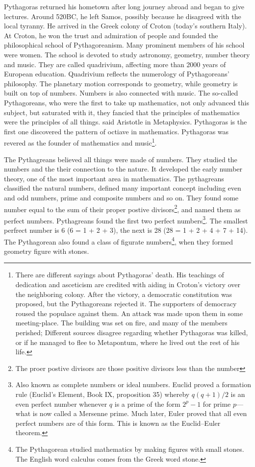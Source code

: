 \documentclass{article}
\begin{document}
Pythagoras returned his hometown after long journey abroad and began to give lectures. Around 520BC, he left Samos, possibly because he disagreed with the local tyranny. He arrived in the Greek colony of Croton (today's southern Italy). At Croton, he won the trust and admiration of people and founded the philosophical school of Pythagoreanism. Many prominent members of his school were women. The school is devoted to study astronomy, geometry, number theory and music. They are called quadrivium, affecting more than 2000 years of European education\cite{StepanovRose15}. Quadrivium reflects the numerology of Pythagoreans' philosophy. The planetary motion corresponds to geometry, while geometry is built on top of numbers. Numbers is also connected with music. The so-called Pythagoreans, who were the first to take up mathematics, not only advanced this subject, but saturated with it, they fancied that the principles of mathematics were the principles of all things. said Aristotle in Metaphysics. Pythagoras is the first one discovered the pattern of octiave in mathematics. Pythagoras was revered as the founder of mathematics and music\footnote{There are different sayings about Pythagoras' death. His teachings of dedication and asceticism are credited with aiding in Croton's victory over the neighboring colony. After the victory, a democratic constitution was proposed, but the Pythagoreans rejected it. The supporters of democracy roused the populace against them. An attack was made upon them in some meeting-place. The building was set on fire, and many of the members perished; Different sources disagree regarding whether Pythagoras was killed, or if he managed to flee to Metapontum, where he lived out the rest of his life.}.

The Pythagreans believed all things were made of numbers. They studied the numbers and the their connection to the nature. It developed the early number theory, one of the most important area in mathematics. The pythagreans classified the natural numbers, defined many important concept including even and odd numbers, prime and composite numbers and so on. They found some number equal to the sum of their proper postive divisors\footnote{The proer postive divisors are those positive divisors less than the number}, and named them as perfect numbers. Pythagreans found the first two perfect numbers\footnote{Also known as complete numbers or ideal numbers. Euclid proved a formation rule (Euclid's Element, Book IX, proposition 35) whereby $q(q+1)/2$ is an even perfect number whenever $q$ is a prime of the form $2^p-1$ for prime $p$—what is now called a Mersenne prime. Much later, Euler proved that all even perfect numbers are of this form. This is known as the Euclid–Euler theorem.}. The smallest perfrect number is 6 (6 = 1 + 2 + 3), the next is 28 (28 = 1 + 2 + 4 + 7 + 14). The Pythagorean also found a class of figurate numbers\footnote{The Pythagorean studied mathematics by making figures with small stones. The English word calculus comes from the Greek word stone\cite{HanXueTao16}.}, when they formed geometry figure with stones.
\end{document}
